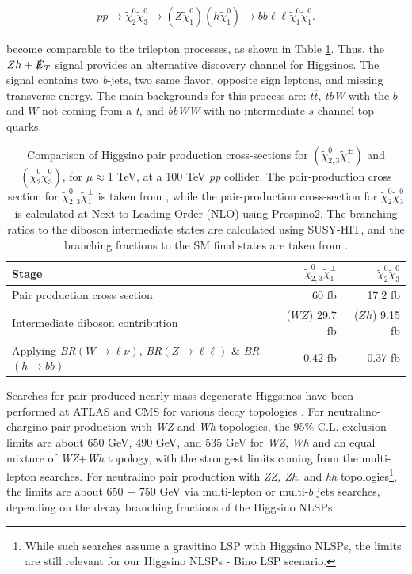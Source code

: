 \documentclass[a4paper,11pt]{article}
\newcommand{\N}{\widetilde{\chi}^0}
\newcommand{\C}{\widetilde{\chi}^\pm}
\newcommand{\met}{{\slashed{E}_T}}
\begin{document}
\begin{align}
  pp\rightarrow \N_2\N_3\rightarrow (Z\N_1)(h\N_1)\rightarrow bb\ell\ell \N_1\N_1.
\end{align} 

\noindent become comparable to the trilepton processes, as shown in Table
\ref{tab:xsections}. Thus, the $Zh+\met$ signal provides an alternative discovery
channel for Higgsinos. The signal contains two \emph{b}-jets, two same flavor,
opposite sign leptons, and missing transverse energy. The main backgrounds for
this process are: $t\overline{t}$, \emph{tbW} with the $b$ and $W$ not coming
from a \emph{t}, and \emph{bbWW} with no intermediate $s$-channel top quarks.  




\begin{table}
  \centering
  \begin{tabular}{l|rr}
    \toprule
    Stage & $\N_{2,3}\C_1$ & $\N_2\N_3$\\
    \midrule
    Pair production cross section & 60 fb & 17.2 fb\\
    Intermediate diboson contribution & ($WZ$) 29.7 fb  & ($Zh$) 9.15 fb \\
    Applying \emph{BR}$(W\rightarrow \ell\nu)$, \emph{BR}$(Z\rightarrow \ell\ell)$ \& \emph{BR}$(h\rightarrow bb)$ & 0.42 fb & 0.37 fb\\
    \bottomrule
  \end{tabular}
  \caption{Comparison of Higgsino pair production cross-sections for
    $(\N_{2,3}\C_1)$ and
    $(\N_{2}\N_{3})$, for $\mu\approx 1$ TeV, at a 100
    TeV \emph{pp} collider. 
    The pair-production cross section for $\N_{2,3}\C_1$ is taken from
    \cite{Gori:2014oua}, while the pair-production cross-section for $\N_2\N_3$
    is calculated at Next-to-Leading Order (NLO) using Prospino2. The branching
    ratios to the diboson intermediate states are calculated using SUSY-HIT,
    and the branching fractions to the SM final states are taken from
    \cite{Olive:2016xmw}.}
  \label{tab:xsections}
\end{table}



Searches for pair produced nearly mass-degenerate Higgsinos  have been
performed at ATLAS and CMS for various decay topologies \cite{Aaboud:2018htj,
Sirunyan:2018ubx, Aaboud:2018zeb}.  For neutralino-chargino pair production
with \emph{WZ} and \emph{Wh} topologies, the 95\% C.L. exclusion limits are
about 650 GeV, 490 GeV, and 535 GeV for \emph{WZ}, \emph{Wh} and an equal
mixture of \emph{WZ}+\emph{Wh} topology, with the strongest limits coming from
the multi-lepton searches.  For neutralino pair production with \emph{ZZ, Zh},
and \emph{hh} topologies\footnote{While such searches assume a gravitino LSP
  with Higgsino NLSPs, the limits are still relevant for our Higgsino NLSPs -
  Bino LSP scenario.}, the limits are about 650 $-$ 750 GeV via multi-lepton or
  multi-$b$ jets searches, depending on the decay branching fractions of the
  Higgsino NLSPs. 
\end{document}
